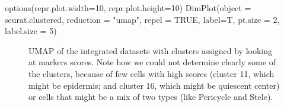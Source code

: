 \documentclass[
  letterpaper,
  DIV=11,
  numbers=noendperiod]{scrartcl}
\newenvironment{Shaded}{}{}
\newcommand{\AttributeTok}[1]{\textcolor[rgb]{0.49,0.56,0.16}{#1}}
\newcommand{\ConstantTok}[1]{\textcolor[rgb]{0.53,0.00,0.00}{#1}}
\newcommand{\DecValTok}[1]{\textcolor[rgb]{0.25,0.63,0.44}{#1}}
\newcommand{\FunctionTok}[1]{\textcolor[rgb]{0.02,0.16,0.49}{#1}}
\newcommand{\NormalTok}[1]{#1}
\newcommand{\StringTok}[1]{\textcolor[rgb]{0.25,0.44,0.63}{#1}}
\begin{document}
\begin{Shaded}
\begin{Highlighting}[]
\FunctionTok{options}\NormalTok{(}\AttributeTok{repr.plot.width=}\DecValTok{10}\NormalTok{, }\AttributeTok{repr.plot.height=}\DecValTok{10}\NormalTok{)}
\FunctionTok{DimPlot}\NormalTok{(}\AttributeTok{object =}\NormalTok{ seurat.clustered, }\AttributeTok{reduction =} \StringTok{"umap"}\NormalTok{, }\AttributeTok{repel =} \ConstantTok{TRUE}\NormalTok{, }\AttributeTok{label=}\NormalTok{T, }\AttributeTok{pt.size =} \DecValTok{2}\NormalTok{, }\AttributeTok{label.size =} \DecValTok{5}\NormalTok{)}
\end{Highlighting}
\end{Shaded}

\begin{figure}[H]


\caption{\label{fig-umapbyeye}UMAP of the integrated datasets with
clusters assigned by looking at markers scores. Note how we could not
determine clearly some of the clusters, because of few cells with high
scores (cluster 11, which might be epidermis; and cluster 16, which
might be quiescent center) or cells that might be a mix of two types
(like Pericycle and Stele).}

\end{figure}%
\end{document}
